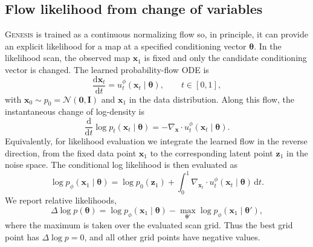 \documentclass[usenatbib]{mnras}
\newcommand{\thetavec}{\boldsymbol{\theta}}
\begin{document}
\subsection{Flow likelihood from change of variables}
\label{sec:likelihood_change}

\textsc{Genesis} is trained as a continuous normalizing flow so,
in principle, it can provide an explicit likelihood for a map at a
specified conditioning vector $\thetavec$. In the likelihood scan, the
observed map $\mathbf{x}_1$ is fixed and only the candidate
conditioning vector is changed.
The learned probability-flow ODE is
\begin{equation}
  \frac{\mathrm{d}\mathbf{x}_t}{\mathrm{d}t}
  =
  u_t^\phi(\mathbf{x}_t\mid\thetavec),
  \qquad t\in[0,1],
  \label{eq:likelihood_pfode}
\end{equation}
with $\mathbf{x}_0\sim p_0=\mathcal{N}(\mathbf{0},\mathbf{I})$ and
$\mathbf{x}_1$ in the data distribution. Along this flow, the
instantaneous change of log-density is
\begin{equation}
  \frac{\mathrm{d}}{\mathrm{d}t}
  \log p_t(\mathbf{x}_t\mid\thetavec)
  =
  -
  \nabla_{\mathbf{x}}\!\cdot
  u_t^\phi(\mathbf{x}_t\mid\thetavec).
  \label{eq:instantaneous_change}
\end{equation}
Equivalently, for likelihood evaluation we integrate the learned flow
in the reverse direction, from the fixed data point $\mathbf{x}_1$ to
the corresponding latent point $\mathbf{z}_1$ in the noise space. The
conditional log likelihood is then evaluated as
\begin{equation}
  \log p_\phi(\mathbf{x}_1\mid\thetavec)
  =
  \log p_0(\mathbf{z}_1)
  +
  \int_0^1
  \nabla_{\mathbf{x}_t}\!\cdot
  u_t^\phi(\mathbf{x}_t\mid\thetavec)
  \,\mathrm{d}t .
  \label{eq:cnf_likelihood}
\end{equation}
We report relative likelihoods,
\begin{equation}
  \Delta\log p(\thetavec)
  =
  \log p_\phi(\mathbf{x}_1\mid\thetavec)
  -
  \max_{\thetavec'}
  \log p_\phi(\mathbf{x}_1\mid\thetavec'),
  \label{eq:dlogp_scan}
\end{equation}
where the maximum is taken over the evaluated scan grid. Thus the
best grid point has $\Delta\log p=0$, and all other grid points have
negative values.
\end{document}
